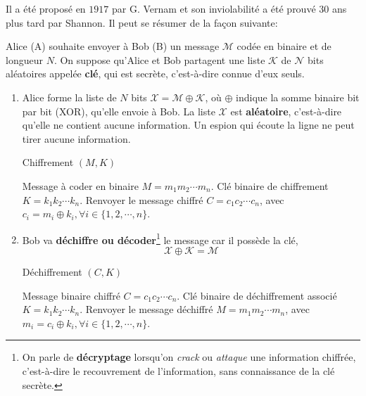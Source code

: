 Il a été proposé en $1917$ par G. Vernam et son inviolabilité a été prouvé $30$
ans plus tard par Shannon. Il peut se résumer de la façon suivante:

Alice (A) souhaite envoyer à Bob (B) un message $\mathcal{M}$ codée en binaire
et de longueur $N$. On suppose qu'Alice et Bob partagent une liste
$\mathcal{K}$ de $\mathcal{N}$ bits aléatoires appelée \textbf{clé}, qui est
secrète, c'est-à-dire connue d'eux seuls.

\begin{enumerate}
\item Alice forme la liste de $N$ bits $\mathcal{X}=\mathcal{M}\oplus
\mathcal{K}$, où $\oplus$ indique la somme binaire bit par bit (XOR), qu'elle
envoie à Bob. La liste $\mathcal{X}$ est \textbf{aléatoire}, c'est-à-dire
qu'elle ne contient aucune information. Un espion qui écoute la ligne ne peut
tirer aucune information.

\begin{algorithm}
\caption{Chiffrement $(M,K)$}
 \begin{algorithmic}[1]
\State Message à coder en binaire $M=m_{1}m_{2}\cdots m_{n}$.
\State Clé binaire de chiffrement $K=k_{1}k_{2}\cdots k_{n}$.
\State Renvoyer le message chiffré $C=c_{1}c_{2}\cdots c_{n}$, avec
$c_{i}=m_{i}\oplus k_{i},\forall i\in \{1,2,\cdots,n\}$.
\end{algorithmic}
\end{algorithm}

\item Bob va \textbf{déchiffre ou décoder}\footnote{On parle de
\textbf{décryptage} lorsqu'on \emph{crack} ou \emph{attaque} une information
chiffrée, c'est-à-dire le recouvrement de l'information, sans connaissance de la
clé secrète.} le message car il possède la clé,%
\begin{equation}
\mathcal{X}\oplus\mathcal{K}=\mathcal{M}%
\end{equation}

\begin{algorithm}
\caption{Déchiffrement $(C,K)$}
 \begin{algorithmic}[1]
\State Message binaire chiffré $C=c_{1}c_{2}\cdots c_{n}$.
\State Clé binaire de déchiffrement associé $K=k_{1}k_{2}\cdots k_{n}$.
\State Renvoyer le message déchiffré $M=m_{1}m_{2}\cdots m_{n}$, avec
$m_{i}=c_{i}\oplus k_{i},\forall i\in \{1,2,\cdots,n\}$.
\end{algorithmic}
\end{algorithm}
\end{enumerate}

